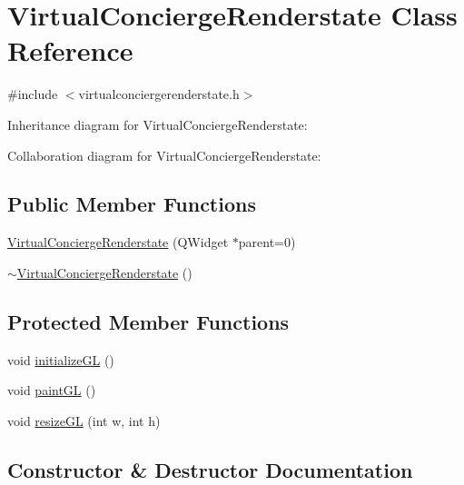 \hypertarget{class_virtual_concierge_renderstate}{}\section{Virtual\+Concierge\+Renderstate Class Reference}
\label{class_virtual_concierge_renderstate}


{\ttfamily \#include $<$virtualconciergerenderstate.\+h$>$}



Inheritance diagram for Virtual\+Concierge\+Renderstate\+:


Collaboration diagram for Virtual\+Concierge\+Renderstate\+:
\subsection*{Public Member Functions}
\begin{DoxyCompactItemize}
\item 
\hyperlink{class_virtual_concierge_renderstate_aa9ade985d02a43a3932383588ff699c3}{Virtual\+Concierge\+Renderstate} (Q\+Widget $\ast$parent=0)
\item 
\hyperlink{class_virtual_concierge_renderstate_a95bdf0ca0d04f9eeefb5f16f9e2fd9d1}{$\sim$\+Virtual\+Concierge\+Renderstate} ()
\end{DoxyCompactItemize}
\subsection*{Protected Member Functions}
\begin{DoxyCompactItemize}
\item 
void \hyperlink{class_virtual_concierge_renderstate_a18560618be2cb31ab5b8d6f6c5a6bf19}{initialize\+G\+L} ()
\item 
void \hyperlink{class_virtual_concierge_renderstate_a53e695a7c29ba6208fcd9386a51c0175}{paint\+G\+L} ()
\item 
void \hyperlink{class_virtual_concierge_renderstate_a00612a1961d7cb9668e821aea529e703}{resize\+G\+L} (int w, int h)
\end{DoxyCompactItemize}


\subsection{Constructor \& Destructor Documentation}
\hypertarget{class_virtual_concierge_renderstate_aa9ade985d02a43a3932383588ff699c3}{}
